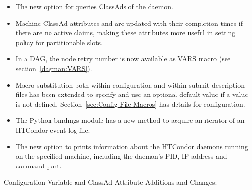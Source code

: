 \begin{itemize}
\item The new  option for  queries ClassAds
of the  daemon.

\item Machine ClassAd attributes 
and  are updated with their
completion times if there are no active claims,
making these attributes more useful in setting policy for
partitionable slots. 

\item In a DAG, the node retry number is now available as VARS macro
(see section~\ref{dagman:VARS}).

\item Macro substitution both within configuration and within submit
description files has been extended to specify and use  
an optional default value if a value is not defined.
Section~\ref{sec:Config-File-Macros} has details for configuration.

\item The Python bindings  module has 
a new  method to acquire an iterator of
an HTCondor event log file.

\item The new  option to  prints information
about the HTCondor daemons running on the specified machine,
including the daemon's PID, IP address and command port.

\end{itemize}

\noindent Configuration Variable and ClassAd Attribute Additions and Changes:

